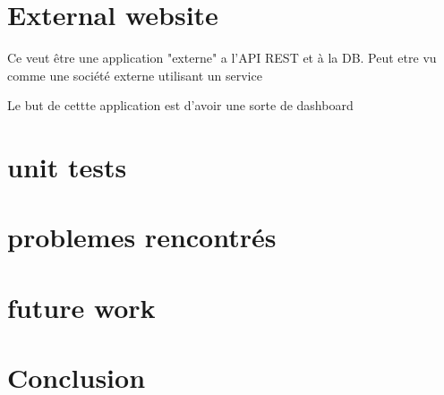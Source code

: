 \section{External website}
Ce veut être une application "externe" a l'API REST et à la DB. Peut etre vu comme une société externe utilisant un service

Le but de cettte application est d'avoir une sorte de dashboard

\section{unit tests}

\section{problemes rencontrés}
\section{future work}
\section{Conclusion}
